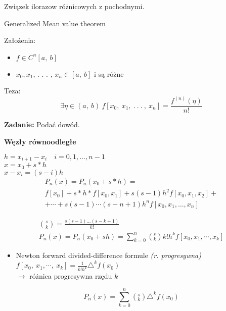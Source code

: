 \begin{frame}
Związek ilorazow różnicowych z pochodnymi.
\begin{block}
{Generalized Mean value theorem}

Założenia:
\begin{itemize}
\item $f\in C^{n}[a,\ b]$
\item $x_{0}, x_{1}$, . . . , $x_{n}\in[a,\ b] $ i są różne
\end{itemize}

Teza:
$$
\exists\eta\in(a,\ b)\ f[x_{0},\ x_{1},\ .\ .\ .\ ,\ x_{n}]=\frac{f^{(n)}(\eta)}{n!}
$$
\end{block}
\vspace{5mm}

\textbf{Zadanie:} Podać dowód.
\end{frame}

\begin{frame}
\textbf{Węzły równoodległe}

$h=x_{i+1}-x_{i} \quad i=0, 1, ..., n-1$ \\
$x=x_{0}+s*h$ \\
$x-x_{i}=(s-i)h$ \\

\begin{gather*} P_{n}(x)=P_{n}(x_{0}+s*h) =\\
   f[x_{0}]+s*h*f[x_{0}, x_{1}]+s(s - 1)h^{2}f[x_{0},x_{1},x_{2}]+ \\
+ \cdots +s(s-1)\cdots(s-n+1)h^{n}f[x_{0},x_{1},\dots ,x_{n}]
\end{gather*}

\begin{gather*}
\binom{s}{k}=\displaystyle \frac{s(s-1)\ldots(s-k+1)}{k!}\\
P_{n}(x)=P_{n}(x_{0}+sh)=\sum_{k=0}^{n}(_{k}^{s})k!h^{k}f[x_{0}, x_{1}, \cdots ,x_{k}]
\end{gather*}
\end{frame}

\begin{frame}
\begin{itemize}
\item Newton forward divided-difference formule {\it (r. progresywna)} \\
\vspace{2mm}
$f[x_{0},\displaystyle \ x_{1},\cdots,\ x_{k}]=\frac{1}{k!h^{k}}\triangle^{k}f(x_{0})$ \\
\vspace{3mm}
$\rightarrow$ różnica progresywna rzędu $k$
\end{itemize}

$$P_{n}(x)=\displaystyle \sum_{k=0}^{n}(_{k}^{s})\triangle^{k}f(x_{0})$$
\end{frame}
